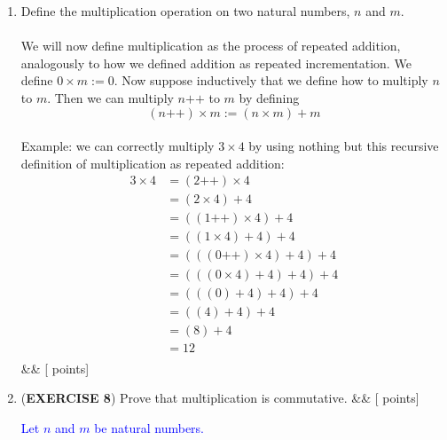 \documentclass[12pt]{article}
\newcommand{\points}[1]{\hfill {[#1 points]}}
\newcommand{\problem}[2][]{%
  \item {#2}%
  \ifx&#1&%
  \else%
    \points{#1}%
  \fi
  \par\vspace{0.5em}
}
\begin{document}
\begin{enumerate}[leftmargin=*, label=\textbf{\arabic*.}]
    \problem{Define the multiplication operation on two natural numbers, $n$ and $m$. \\ \\ We will now define multiplication as the process of repeated addition, analogously to how we defined addition as repeated incrementation. We define $0 \times m := 0$. Now suppose inductively that we define how to multiply $n$ to $m$. Then we can multiply $n\text{++}$ to $m$ by defining $$(n\text{++}) \times m := (n \times m) + m$$ \\
    Example: we can correctly multiply $3 \times 4$ by using nothing but this recursive definition of multiplication as repeated addition:
    \begin{align*}
    3 \times 4 &= (2\text{++}) \times 4 \\ 
                   &= (2 \times 4) + 4 \\
                   &= ((1\text{++}) \times 4) + 4 \\
                   &= ((1 \times 4) + 4) + 4 \\
                   &= (((0\text{++}) \times 4) + 4) + 4 \\
                   &= (((0 \times 4) + 4) + 4) + 4 \\  
                   &= (((0) + 4) + 4) + 4 \\
                   &= ((4) + 4) + 4 \\                              
                   &= (8) + 4 \\
                   &= 12 \\
    \end{align*}}
    
    \problem{(\textbf{EXERCISE 8}) Prove that multiplication is commutative.}
    \textcolor{blue}{Let $n$ and $m$ be natural numbers.}
   \end{enumerate}
\end{document}

